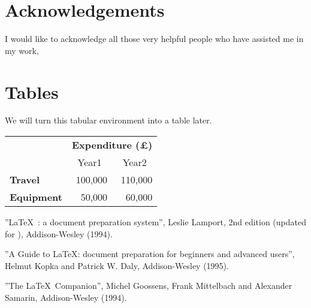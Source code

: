 \documentclass[12pt]{scrbook}
\begin{document}
\chapter*{Acknowledgements}

I would like to acknowledge all those
very helpful people who have assisted me in my work,

\appendix

\chapter{Tables}
We will turn this tabular environment into a table later.

\begin{tabular}{lrr}
                     & \multicolumn{2}{c}{\bfseries Expenditure (\pounds)} \\
                     & \multicolumn{1}{c}{Year1} & \multicolumn{1}{c}{Year2} \\
 \bfseries Travel    & 100,000 & 110,000 \\
 \bfseries Equipment & 50,000  & 60,000
\end{tabular}

\begin{thebibliography}{Goossens 1994}
     ''\LaTeX\ : a document preparation system'',
    Leslie Lamport, 2nd edition (updated for \LaTeXe), Addison-Wesley (1994).

     ''A Guide to \LaTeX: document preparation for
    beginners and advanced users'', Helmut Kopka and Patrick W. Daly, 
    Addison-Wesley (1995).

     ''The \LaTeX\ Companion'', Michel Goossens,
    Frank Mittelbach and Alexander Samarin, Addison-Wesley (1994).
\end{thebibliography}
\end{document}
